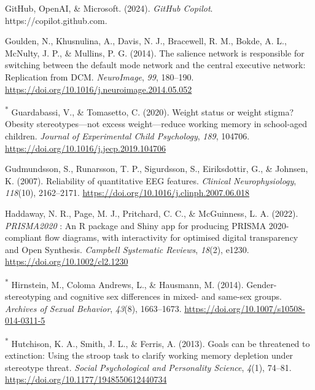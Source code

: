 \documentclass[
  stu, a4paper,floatsintext]{apa7}
\newlength{\cslhangindent}
\newenvironment{CSLReferences}[2] %
 {\begin{list}{}{%
  \setlength{\itemindent}{0pt}
  \setlength{\leftmargin}{0pt}
  \setlength{\parsep}{0pt}
  \ifodd #1
   \setlength{\leftmargin}{\cslhangindent}
   \setlength{\itemindent}{-1\cslhangindent}
  \fi
  \setlength{\itemsep}{#2\baselineskip}}}
 {\end{list}}
\begin{document}
\begin{CSLReferences}{1}{0}
GitHub, OpenAI, \& Microsoft. (2024). \emph{{GitHub Copilot}}. https://copilot.github.com.

Goulden, N., Khusnulina, A., Davis, N. J., Bracewell, R. M., Bokde, A. L., McNulty, J. P., \& Mullins, P. G. (2014). The salience network is responsible for switching between the default mode network and the central executive network: {Replication} from {DCM}. \emph{NeuroImage}, \emph{99}, 180--190. \url{https://doi.org/10.1016/j.neuroimage.2014.05.052}

\textsuperscript{*} Guardabassi, V., \& Tomasetto, C. (2020). Weight status or weight stigma? {Obesity} stereotypes---not excess weight---reduce working memory in school-aged children. \emph{Journal of Experimental Child Psychology}, \emph{189}, 104706. \url{https://doi.org/10.1016/j.jecp.2019.104706}

Gudmundsson, S., Runarsson, T. P., Sigurdsson, S., Eiriksdottir, G., \& Johnsen, K. (2007). Reliability of quantitative {EEG} features. \emph{Clinical Neurophysiology}, \emph{118}(10), 2162--2171. \url{https://doi.org/10.1016/j.clinph.2007.06.018}

Haddaway, N. R., Page, M. J., Pritchard, C. C., \& McGuinness, L. A. (2022). {\emph{PRISMA2020}} : {An R} package and {Shiny} app for producing {PRISMA} 2020-compliant flow diagrams, with interactivity for optimised digital transparency and {Open Synthesis}. \emph{Campbell Systematic Reviews}, \emph{18}(2), e1230. \url{https://doi.org/10.1002/cl2.1230}

\textsuperscript{*} Hirnstein, M., Coloma Andrews, L., \& Hausmann, M. (2014). Gender-stereotyping and cognitive sex differences in mixed- and same-sex groups. \emph{Archives of Sexual Behavior}, \emph{43}(8), 1663--1673. \url{https://doi.org/10.1007/s10508-014-0311-5}

\textsuperscript{*} Hutchison, K. A., Smith, J. L., \& Ferris, A. (2013). Goals can be threatened to extinction: {Using} the stroop task to clarify working memory depletion under stereotype threat. \emph{Social Psychological and Personality Science}, \emph{4}(1), 74--81. \url{https://doi.org/10.1177/1948550612440734}


\end{CSLReferences}
\end{document}
